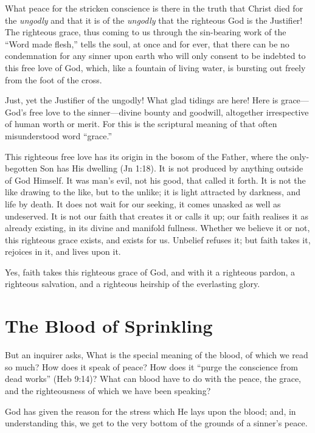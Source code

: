 \documentclass[
]{book}
\begin{document}
What peace for the stricken conscience is there in the truth that Christ died for the \emph{ungodly} and that it is of the \emph{ungodly} that the righteous God is the Justifier! The righteous grace, thus coming to us through the sin-bearing work of the ``Word made flesh,'' tells the soul, at once and for ever, that there can be no condemnation for any sinner upon earth who will only consent to be indebted to this free love of God, which, like a fountain of living water, is bursting out freely from the foot of the cross.

Just, yet the Justifier of the ungodly! What glad tidings are here! Here is grace---God's free love to the sinner---divine bounty and goodwill, altogether irrespective of human worth or merit. For this is the scriptural meaning of that often misunderstood word ``grace.''

This righteous free love has its origin in the bosom of the Father, where the only-begotten Son has His dwelling (Jn 1:18). It is not produced by anything outside of God Himself. It was man's evil, not his good, that called it forth. It is not the like drawing to the like, but to the unlike; it is light attracted by darkness, and life by death. It does not wait for our seeking, it comes unasked as well as undeserved. It is not our faith that creates it or calls it up; our faith realises it as already existing, in its divine and manifold fullness. Whether we believe it or not, this righteous grace exists, and exists for us. Unbelief refuses it; but faith takes it, rejoices in it, and lives upon it.

Yes, faith takes this righteous grace of God, and with it a righteous pardon, a righteous salvation, and a righteous heirship of the everlasting glory.

\hypertarget{the-blood-of-sprinkling}{%
\chapter{The Blood of Sprinkling}\label{the-blood-of-sprinkling}}

But an inquirer asks, What is the special meaning of the blood, of which we read so much? How does it speak of peace? How does it ``purge the conscience from dead works'' (Heb 9:14)? What can blood have to do with the peace, the grace, and the righteousness of which we have been speaking?

God has given the reason for the stress which He lays upon the blood; and, in understanding this, we get to the very bottom of the grounds of a sinner's peace.
\end{document}
